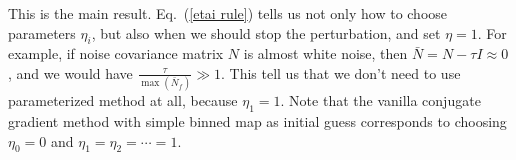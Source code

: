\documentclass[11pt, letterpaper]{article}
\newcommand{\Nbar}{\bar{N}}
\begin{document}

This is the main result.  Eq.~(\ref{etai rule}) tells us not only how to choose parameters $\eta_i$,
but also when we should stop the perturbation, and set $\eta = 1$.
For example, if noise covariance matrix $N$ is almost white noise,
then $\Nbar = N - \tau I \approx 0$,
and we would have $\frac{\tau}{\max(\Nbar_f)} \gg 1$.
This tell us that we don't need to use parameterized method at all, 
because $\eta_1 = 1$.
Note that the vanilla conjugate gradient method with simple binned map as
initial guess corresponds to choosing $\eta_0=0$ and $\eta_1= \eta_2 = \cdots
= 1$.
\end{document}
